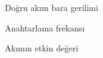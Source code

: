 \begingroup
\singlespacing
\begin{description}[leftmargin=32mm,labelwidth=27mm,itemsep=6pt]
  \item[$V_{\mathrm{da}}$] Doğru akım bara gerilimi
  \item[$f_{\mathrm{s}}$] Anahtarlama frekansı
  \item[$I_{\mathrm{rms}}$] Akımın etkin değeri
\end{description}
\endgroup
